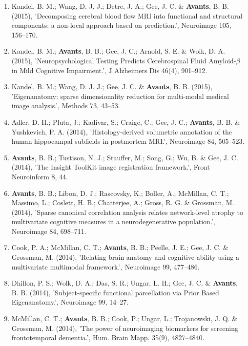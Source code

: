 \documentclass[11pt]{moderncv} %
\begin{document}
\begin{enumerate}
\item Kandel, B. M.; Wang, D. J. J.; Detre, J. A.; Gee, J. C. \& \textbf{Avants}, B. B. (2015), 'Decomposing cerebral blood flow MRI into functional and structural components: a non-local approach based on prediction.', Neuroimage 105, 156--170.

\item Kandel, B. M.; \textbf{Avants}, B. B.; Gee, J. C.; Arnold, S. E. \& Wolk, D. A. (2015), 'Neuropsychological Testing Predicts Cerebrospinal Fluid Amyloid-$\beta$ in Mild Cognitive Impairment.', J Alzheimers Dis 46(4), 901--912.

\item Kandel, B. M.; Wang, D. J. J.; Gee, J. C. \& \textbf{Avants}, B. B. (2015), 'Eigenanatomy: sparse dimensionality reduction for multi-modal medical image analysis.', Methods 73, 43--53.

\item Adler, D. H.; Pluta, J.; Kadivar, S.; Craige, C.; Gee, J. C.; \textbf{Avants}, B. B. \&  Yushkevich, P. A. (2014), 'Histology-derived volumetric annotation of the human hippocampal subfields in postmortem MRI.', Neuroimage 84, 505--523.

\item \textbf{Avants}, B. B.; Tustison, N. J.; Stauffer, M.; Song, G.; Wu, B. \&  Gee, J. C. (2014), 'The Insight ToolKit image registration framework.', Front Neuroinform 8, 44.

\item  \textbf{Avants}, B. B.; Libon, D. J.; Rascovsky, K.; Boller, A.; McMillan, C. T.; Massimo, L.; Coslett, H. B.; Chatterjee, A.; Gross, R. G. \&  Grossman, M. (2014), 'Sparse canonical correlation analysis relates network-level atrophy to multivariate cognitive measures in a neurodegenerative population.', Neuroimage 84, 698--711.

\item  Cook, P. A.; McMillan, C. T.; \textbf{Avants}, B. B.; Peelle, J. E.; Gee, J. C. \&  Grossman, M. (2014), 'Relating brain anatomy and cognitive ability using a multivariate multimodal framework.', Neuroimage 99, 477--486.

\item  Dhillon, P. S.; Wolk, D. A.; Das, S. R.; Ungar, L. H.; Gee, J. C. \&  \textbf{Avants}, B. B. (2014), 'Subject-specific functional parcellation via Prior Based Eigenanatomy.', Neuroimage 99, 14--27.

\item  McMillan, C. T.; \textbf{Avants}, B. B.; Cook, P.; Ungar, L.; Trojanowski, J. Q. \&  Grossman, M. (2014), 'The power of neuroimaging biomarkers for screening frontotemporal dementia.', Hum. Brain Mapp. 35(9), 4827--4840.


\end{enumerate}
\end{document}
